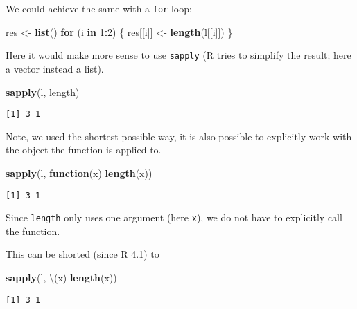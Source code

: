 \documentclass[ignorenonframetext,,t]{beamer}
\let\oldtextbf\textbf
\renewcommand{\textbf}[1]{\textcolor{spamwell}{\oldtextbf{#1}}}
\newenvironment{Shaded}{\begin{snugshade}}{\end{snugshade}}
\newcommand{\ControlFlowTok}[1]{\textcolor[rgb]{0.13,0.29,0.53}{\textbf{#1}}}
\newcommand{\DecValTok}[1]{\textcolor[rgb]{0.00,0.00,0.81}{#1}}
\newcommand{\FunctionTok}[1]{\textcolor[rgb]{0.13,0.29,0.53}{\textbf{#1}}}
\newcommand{\NormalTok}[1]{#1}
\newcommand{\OtherTok}[1]{\textcolor[rgb]{0.56,0.35,0.01}{#1}}
\newcommand{\SpecialCharTok}[1]{\textcolor[rgb]{0.81,0.36,0.00}{\textbf{#1}}}
\begin{document}
\begin{frame}[fragile]
We could achieve the same with a \texttt{for}-loop:

\begin{Shaded}
\begin{Highlighting}[]
\NormalTok{res }\OtherTok{\textless{}{-}} \FunctionTok{list}\NormalTok{()}
\ControlFlowTok{for}\NormalTok{ (i }\ControlFlowTok{in} \DecValTok{1}\SpecialCharTok{:}\DecValTok{2}\NormalTok{) \{}
\NormalTok{  res[[i]] }\OtherTok{\textless{}{-}} \FunctionTok{length}\NormalTok{(l[[i]])}
\NormalTok{\}}
\end{Highlighting}
\end{Shaded}
\end{frame}

\begin{frame}[fragile]
Here it would make more sense to use \texttt{sapply} (R tries to
simplify the result; here a vector instead a list).

\begin{Shaded}
\begin{Highlighting}[]
\FunctionTok{sapply}\NormalTok{(l, length)}
\end{Highlighting}
\end{Shaded}

\begin{verbatim}
[1] 3 1
\end{verbatim}
\end{frame}

\begin{frame}[fragile]
Note, we used the shortest possible way, it is also possible to
explicitly work with the object the function is applied to.

\begin{Shaded}
\begin{Highlighting}[]
\FunctionTok{sapply}\NormalTok{(l, }\ControlFlowTok{function}\NormalTok{(x) }\FunctionTok{length}\NormalTok{(x))}
\end{Highlighting}
\end{Shaded}

\begin{verbatim}
[1] 3 1
\end{verbatim}

Since \texttt{length} only uses one argument (here \texttt{x}), we do
not have to explicitly call the function.

This can be shorted (since R 4.1) to

\begin{Shaded}
\begin{Highlighting}[]
\FunctionTok{sapply}\NormalTok{(l, \textbackslash{}(x) }\FunctionTok{length}\NormalTok{(x))}
\end{Highlighting}
\end{Shaded}

\begin{verbatim}
[1] 3 1
\end{verbatim}
\end{frame}
\end{document}
